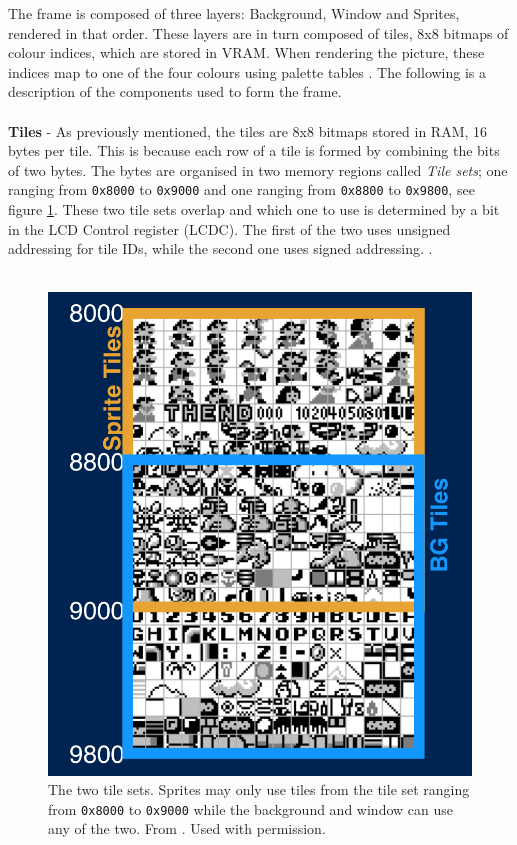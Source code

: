 The frame is composed of three layers: Background, Window and Sprites, rendered in that order. These layers are in turn composed of tiles, 8x8 bitmaps of colour indices, which are stored in VRAM. When rendering the picture, these indices map to one of the four colours using palette tables \cite{gameboyarchitecture}. The following is a description of the components used to form the frame.\\
\\
\textbf{Tiles} - 
As previously mentioned, the tiles are 8x8 bitmaps stored in RAM, 16 bytes per tile. This is because each row of a tile is formed by combining the bits of two bytes. The bytes are organised in two memory regions called \textit{Tile sets}; one ranging from \texttt{0x8000} to \texttt{0x9000} and one ranging from \texttt{0x8800} to \texttt{0x9800}, see figure \ref{fig:ppu_tile_set}. These two tile sets overlap and which one to use is determined by a bit in the LCD Control register (LCDC). The first of the two uses unsigned addressing for tile IDs, while the second one uses signed addressing. \cite{gameboyarchitecture}.\\
\\
\begin{figure}[H]
    \centering
    \includegraphics[width=\linewidth]{figures/PPU/PPU_tile_sets_divided.png}
    \caption{The two tile sets. Sprites may only use tiles from the tile set ranging from \texttt{0x8000} to \texttt{0x9000} while the background and window can use any of the two. From \cite{ultimateGBtalkSlides}. Used with permission.}
    \label{fig:ppu_tile_set}
\end{figure}
